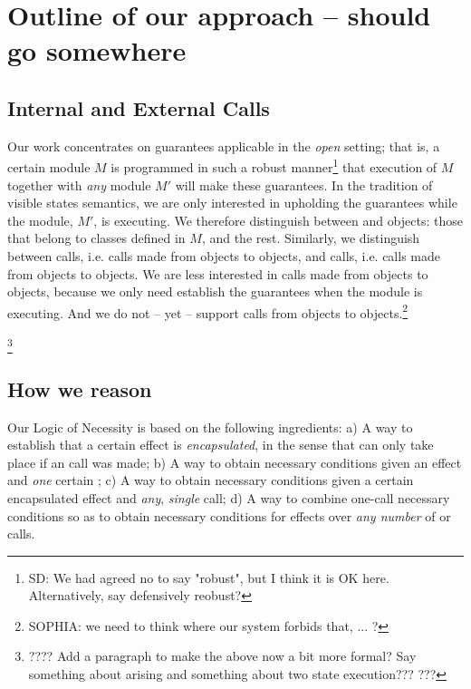\section{Outline of our approach -- should go somewhere}

\subsection{Internal and External Calls} 
Our work concentrates on guarantees applicable in the \emph{open} setting; that is, a certain module
$M$ is programmed in such a robust manner\footnote{SD: We had agreed no to say "robust", but I think it is OK here. Alternatively, say defensively reobust?} that execution of $M$ together with \emph{any} \externalM 
module $M'$ will make these guarantees. In the tradition of
visible states semantics, we are  only interested in upholding the guarantees while the 
\externalM module, $M'$, is executing.   
 We therefore distinguish between \emph{\internalO} and
\emph{\externalO} objects: those that belong to classes defined in $M$, and the rest. Similarly, we 
distinguish between \emph{\internalC} calls, i.e. calls made from \externalO objects to \internalO objects,
and \emph{\externalC} calls, i.e. calls made from \externalC objects to \externalC objects. We are less
interested in calls made from \internalO objects to \internalO objects, because we only need 
establish the guarantees when the \externalM module is executing. And we do not -- yet -- support calls from
\internalO objects to \externalO objects.\footnote{SOPHIA: we need to think where our system forbids that, ... ?}

\footnote{???? Add a paragraph to make the above now a bit more formal? Say something about arising and something about two state execution??? ???}

\subsection{How we reason}

Our Logic of Necessity is based on the following ingredients: 
a) A  %
way to  establish that a certain effect is \emph{encapsulated}, in the 
sense that can only take place if an \internalC call was made; 
b) A way to obtain necessary conditions given an effect and \emph{one}
 certain \internalC;
c) A way to obtain necessary conditions given a certain encapsulated effect and \emph{any},
\emph{single} \internalC call;
d) A way to combine one-call   necessary conditions  so as to obtain necessary conditions 
for effects over 
\emph{any number} of \internalC or \externalC calls.

